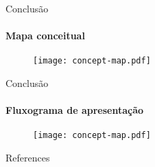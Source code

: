 

\begin{frame}[t]{Conclusão}
    \transboxout[duration=0.5]
    \framesubtitle{Mapa conceitual}    %

    \begin{figure}
        \texttt{[image: concept-map.pdf]}
    \end{figure}
\end{frame}

\begin{frame}[t]{Conclusão}
    \transboxout[duration=0.5]
    \framesubtitle{Fluxograma de apresentação}    %

    \begin{figure}
        \texttt{[image: concept-map.pdf]}
    \end{figure}
\end{frame}

 \begin{frame}[t, allowframebreaks]{References}

  
  
    
     

\end{frame}